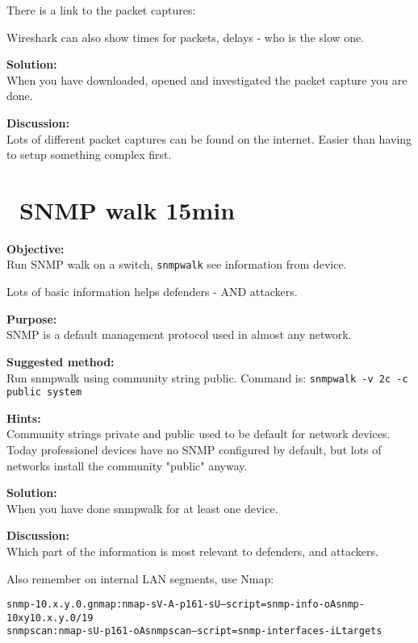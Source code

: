 \documentclass[a4paper,11pt,notitlepage]{report}
\begin{document}
There is a link to the packet captures:\\

Wireshark can also show times for packets, delays - who is the slow one.

{\bf Solution:}\\
When you have downloaded, opened and investigated the packet capture you are done.

{\bf Discussion:}\\
Lots of different packet captures can be found on the internet. Easier than having to setup something complex first.


\chapter{\faExclamationTriangle\ SNMP walk 15min}
\label{ex:snmpwalk}

{\bf Objective:}\\
Run SNMP walk on a switch, \verb+snmpwalk+ see information from device.

Lots of basic information helps defenders - AND attackers.

{\bf Purpose:}\\
SNMP is a default management protocol used in almost any network.

{\bf Suggested method:}\\
Run snmpwalk using community string public.
Command is: \verb+snmpwalk -v 2c -c public system+


{\bf Hints:}\\
Community strings private and public used to be default for network devices. Today professionel devices have no SNMP configured by default, but lots of networks install the community "public" anyway.

{\bf Solution:}\\
When you have done snmpwalk for at least one device.

{\bf Discussion:}\\
Which part of the information is most relevant to defenders, and attackers.

Also remember on internal LAN segments, use Nmap:
\begin{alltt}
snmp-10.x.y.0.gnmap: nmap -sV -A -p 161 -sU --script=snmp-info -oA snmp-10xy 10.x.y.0/19
snmpscan: nmap -sU -p 161 -oA snmpscan --script=snmp-interfaces -iL targets
\end{alltt}
\end{document}
